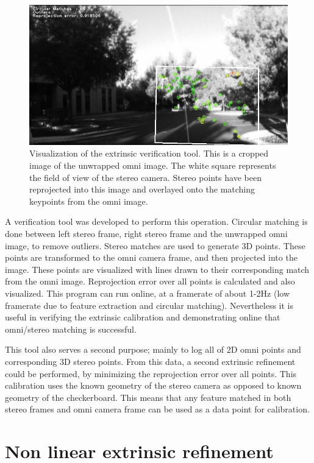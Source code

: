 \begin{figure}[h!]
  \centering
    \includegraphics[width=1.0\textwidth]{chapters/images/circ_matches}
  \caption{Visualization of the extrinsic verification tool. This is a cropped image of the unwrapped omni image.  The white square represents the field of view of the stereo camera.  Stereo points have been reprojected into this image and overlayed onto the matching keypoints from the omni image. }
  \label{fig:circ_matches}
\end{figure}

A verification tool was developed to perform this operation.  Circular matching is done between left stereo frame, right stereo frame and the unwrapped omni image, to remove outliers.  Stereo matches are used to generate 3D points.  These points are transformed to the omni camera frame, and then projected into the image.  These points are visualized with lines drawn to their corresponding match from the omni image.  Reprojection error over all points is calculated and also visualized.  This program can run online, at a framerate of about 1-2Hz (low framerate due to feature extraction and circular matching).  Nevertheless it is useful in verifying the extrinsic calibration and demonstrating online that omni/stereo matching is successful.

This tool also serves a second purpose; mainly to log all of 2D omni points and corresponding 3D stereo points.  From this data, a second extrinsic refinement could be performed, by minimizing the reprojection error over all points.  This calibration uses the known geometry of the stereo camera as opposed to known geometry of the checkerboard.  This means that any feature matched in both stereo frames and omni camera frame can be used as a data point for calibration.

\section{Non linear extrinsic refinement}
\label{sec:g2o_extrinsic_cal}

